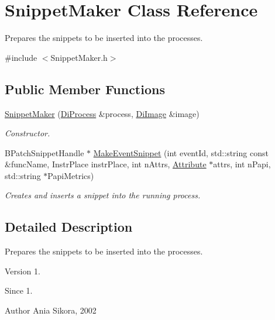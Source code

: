 \hypertarget{class_snippet_maker}{\section{Snippet\-Maker Class Reference}
\label{class_snippet_maker}
}


Prepares the snippets to be inserted into the processes.  




{\ttfamily \#include $<$Snippet\-Maker.\-h$>$}

\subsection*{Public Member Functions}
\begin{DoxyCompactItemize}
\item 
\hyperlink{class_snippet_maker_aabac23880a98e7c9adb75ad37852a541}{Snippet\-Maker} (\hyperlink{class_di_process}{Di\-Process} \&process, \hyperlink{class_di_image}{Di\-Image} \&image)
\begin{DoxyCompactList}\small\item\em Constructor. \end{DoxyCompactList}\item 
B\-Patch\-Snippet\-Handle $\ast$ \hyperlink{class_snippet_maker_af1e250a58d103607a69c3319f8180b78}{Make\-Event\-Snippet} (int event\-Id, std\-::string const \&func\-Name, Instr\-Place instr\-Place, int n\-Attrs, \hyperlink{class_common_1_1_attribute}{Attribute} $\ast$attrs, int n\-Papi, std\-::string $\ast$Papi\-Metrics)
\begin{DoxyCompactList}\small\item\em Creates and inserts a snippet into the running process. \end{DoxyCompactList}\end{DoxyCompactItemize}


\subsection{Detailed Description}
Prepares the snippets to be inserted into the processes. 

\begin{DoxyVersion}{Version}
1. 
\end{DoxyVersion}
\begin{DoxySince}{Since}
1. 
\end{DoxySince}
\begin{DoxyAuthor}{Author}
Ania Sikora, 2002 
\end{DoxyAuthor}


